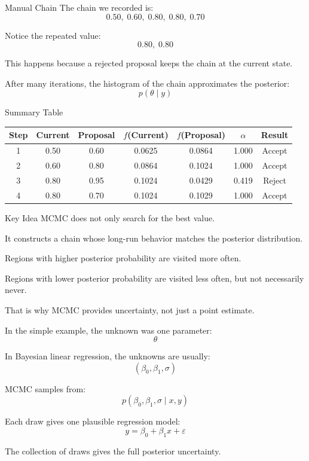 \documentclass[aspectratio=43,11pt]{beamer}
\begin{document}
\begin{frame}{Manual Chain}
The chain we recorded is:
\[
0.50,\;0.60,\;0.80,\;0.80,\;0.70
\]

\vspace{0.4cm}
Notice the repeated value:
\[
0.80,\;0.80
\]

This happens because a rejected proposal keeps the chain at the current state.

\vspace{0.4cm}
After many iterations, the histogram of the chain approximates the posterior:
\[
p(\theta \mid y)
\]
\end{frame}

\begin{frame}{Summary Table}
\centering
\scriptsize
\begin{tabular}{ccccccc}
\toprule
Step & Current & Proposal & $f$(Current) & $f$(Proposal) & $\alpha$ & Result \\
\midrule
1 & 0.50 & 0.60 & 0.0625 & 0.0864 & 1.000 & Accept \\
2 & 0.60 & 0.80 & 0.0864 & 0.1024 & 1.000 & Accept \\
3 & 0.80 & 0.95 & 0.1024 & 0.0429 & 0.419 & Reject \\
4 & 0.80 & 0.70 & 0.1024 & 0.1029 & 1.000 & Accept \\
\bottomrule
\end{tabular}
\end{frame}

\begin{frame}{Key Idea}
MCMC does not only search for the best value.

\vspace{0.4cm}
It constructs a chain whose long-run behavior matches the posterior distribution.

\vspace{0.4cm}
Regions with higher posterior probability are visited more often.

\vspace{0.4cm}
Regions with lower posterior probability are visited less often, but not necessarily never.

\vspace{0.4cm}
That is why MCMC provides uncertainty, not just a point estimate.
\end{frame}

\begin{frame}{} %
In the simple example, the unknown was one parameter:
\[
\theta
\]

In Bayesian linear regression, the unknowns are usually:
\[
(\beta_0,\beta_1,\sigma)
\]

MCMC samples from:
\[
p(\beta_0,\beta_1,\sigma \mid x,y)
\]

Each draw gives one plausible regression model:
\[
y = \beta_0 + \beta_1 x + \varepsilon
\]

The collection of draws gives the full posterior uncertainty.
\end{frame}
\end{document}
